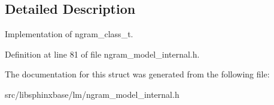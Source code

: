 \subsection{Detailed Description}
Implementation of ngram\+\_\+class\+\_\+t. 

Definition at line 81 of file ngram\+\_\+model\+\_\+internal.\+h.



The documentation for this struct was generated from the following file\+:\begin{DoxyCompactItemize}
\item 
src/libsphinxbase/lm/ngram\+\_\+model\+\_\+internal.\+h\end{DoxyCompactItemize}

